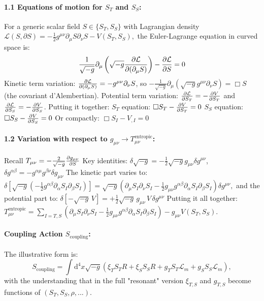 \documentclass[11pt,a4paper]{article}
\newcommand{\ST}{S_T}
\newcommand{\SSp}{S_S}
\newcommand{\Scoupling}{S_{\text{coupling}}}
\newcommand{\Lm}{\mathcal{L}_m}
\newcommand{\Tmnentropic}{T^{\text{entropic}}_{\mu\nu}}
\newcommand{\Tmu}{T_{\mu\nu}}
\begin{document}
\paragraph{1.1 Equations of motion for $\ST$ and $\SSp$: }
For a generic scalar field $S\in\{\ST,\SSp\}$ with Lagrangian density
$\mathcal{L}(S,\partial S)=-\frac{1}{2}g^{\mu\nu}\partial_\mu S\partial_\nu S-V(\ST,\SSp),$
the Euler-Lagrange equation in curved space is:
\begin{equation*}
\frac{1}{\sqrt{-g}}\partial_\mu\left(\sqrt{-g}\pdv{\mathcal{L}}{(\partial_\mu S)}\right)-\pdv{\mathcal{L}}{S}=0
\end{equation*}
Kinetic term variation: $\pdv{\mathcal{L}}{(\partial_\mu S)}=-g^{\mu\nu}\partial_\nu S$, so $-\frac{1}{\sqrt{-g}}\partial_\mu(\sqrt{-g}g^{\mu\nu}\partial_\nu S)=\Box S$ (the covariant d'Alembertian).
Potential term variation: $\pdv{\mathcal{L}}{\ST}=-\pdv{V}{\ST}$ and $\pdv{\mathcal{L}}{\SSp}=-\pdv{V}{\SSp}$.
Putting it together:
$\ST$ equation: $\Box\ST-\pdv{V}{\ST}=0$
$\SSp$ equation: $\Box\SSp-\pdv{V}{\SSp}=0$
Or compactly: $\Box S_I-V_{,I}=0$

\paragraph{1.2 Variation with respect to $g_{\mu\nu}\longrightarrow\Tmnentropic$:}
Recall $\Tmu=-\frac{2}{\sqrt{-g}}\pdv{g_{\mu\nu}}{S}$
Key identities: $\delta\sqrt{-g}=-\frac{1}{2}\sqrt{-g}g_{\mu\nu}\delta g^{\mu\nu}$, $\delta g^{\alpha\beta}=-g^{\alpha\mu}g^{\beta\nu}\delta g_{\mu\nu}$
The kinetic part varies to: \\
$\delta\left[\sqrt{-g}\left(-\frac{1}{2}g^{\alpha\beta}\partial_\alpha S_I\partial_\beta S_I\right)\right]=\sqrt{-g}\left(\partial_\mu S_I\partial_\nu S_I-\frac{1}{2}g_{\mu\nu}g^{\alpha\beta}\partial_\alpha S_I\partial_\beta S_I\right)\delta g^{\mu\nu},$
and the potential part to:
$\delta[-\sqrt{-g}\,V]=+\frac{1}{2}\sqrt{-g}\,g_{\mu\nu}\,V\,\delta g^{\mu\nu}$
Putting it all together: \\
$\Tmnentropic=\sum_{I=T,S}\left(\partial_\mu S_I\partial_\nu S_I-\frac{1}{2}g_{\mu\nu}g^{\alpha\beta}\partial_\alpha S_I\partial_\beta S_I\right)-g_{\mu\nu}V(\ST,\SSp).$

\paragraph{Coupling Action $\Scoupling$:}
The illustrative form is:
\begin{equation}
\Scoupling=\int\text{d}^4x\sqrt{-g}(\xi_T\ST R+\xi_S\SSp R+g_T\ST\Lm+g_S\SSp\Lm) ,
\end{equation}
with the understanding that in the full "resonant" version $\xi_{T,S}$ and $g_{T,S}$ become functions of $(\ST,\SSp,\rho,...)$.
\end{document}
